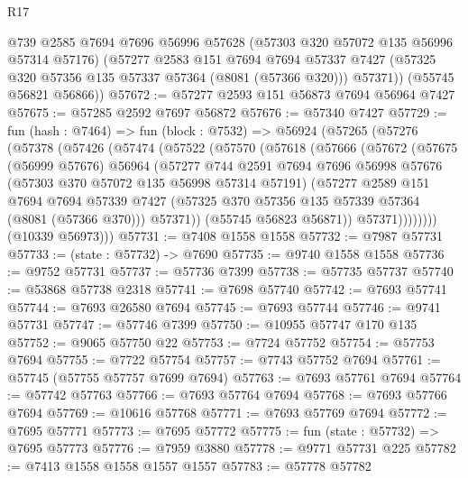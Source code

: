 \begin{lexlean}{R17}
\begin{coremodule}
        @739
        @2585
        @7694
        @7696
        @56996
        @57628
        (@57303 @320 @57072 @135 @56996 @57314 @57176)
        (@57277
          @2583
          @151
          @7694
          @7694
          @57337
          @7427
          (@57325 @320 @57356 @135 @57337 @57364 (@8081 (@57366 @320)))
          @57371))
      (@55745 @56821 @56866))
@57672 := @57277 @2593 @151 @56873 @7694 @56964 @7427
@57675 := @57285 @2592 @7697 @56872
@57676 := @57340 @7427
@57729 := fun (hash : @7464) =>
  fun (block : @7532) =>
  @56924
    (@57265
      (@57276
        (@57378
          (@57426
            (@57474
              (@57522
                (@57570
                  (@57618
                    (@57666
                      (@57672
                        (@57675
                          (@56999 @57676)
                          @56964
                          (@57277
                            @744
                            @2591
                            @7694
                            @7696
                            @56998
                            @57676
                            (@57303 @370 @57072 @135 @56998 @57314 @57191)
                            (@57277
                              @2589
                              @151
                              @7694
                              @7694
                              @57339
                              @7427
                              (@57325 @370 @57356 @135 @57339 @57364 (@8081 (@57366 @370)))
                              @57371))
                          (@55745 @56823 @56871))
                        @57371))))))))
        (@10339 @56973)))
@57731 := @7408 @1558 @1558
@57732 := @7987 @57731
@57733 := (state : @57732) -> @7690
@57735 := @9740 @1558 @1558
@57736 := @9752 @57731
@57737 := @57736 @7399
@57738 := @57735 @57737
@57740 := @53868 @57738 @2318
@57741 := @7698 @57740
@57742 := @7693 @57741
@57744 := @7693 @26580 @7694
@57745 := @7693 @57744
@57746 := @9741 @57731
@57747 := @57746 @7399
@57750 := @10955 @57747 @170 @135
@57752 := @9065 @57750 @22
@57753 := @7724 @57752
@57754 := @57753 @7694
@57755 := @7722 @57754
@57757 := @7743 @57752 @7694
@57761 := @57745 (@57755 @57757 @7699 @7694)
@57763 := @7693 @57761 @7694
@57764 := @57742 @57763
@57766 := @7693 @57764 @7694
@57768 := @7693 @57766 @7694
@57769 := @10616 @57768
@57771 := @7693 @57769 @7694
@57772 := @7695 @57771
@57773 := @7695 @57772
@57775 := fun (state : @57732) => @7695 @57773
@57776 := @7959 @3880
@57778 := @9771 @57731 @225
@57782 := @7413 @1558 @1558 @1557 @1557
@57783 := @57778 @57782

\end{coremodule}
\end{lexlean}
